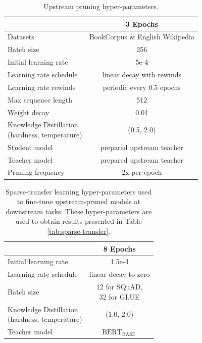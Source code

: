 \documentclass[11pt]{article}
\newcommand{\greyrule}{\arrayrulecolor{black!30}\midrule\arrayrulecolor{black}}
\newcommand{\bert}{$\textrm{BERT}_{\textrm{BASE}}\,$}
\begin{document}
\begin{table}
      \centering
         {\small 
            \begin{tabular}{l|c}
            \toprule
            & 3 Epochs \\
            \midrule
            Datasets & BookCorpus \& English Wikipedia \\
            \greyrule
            Batch size & 256 \\
            \greyrule
            Initial learning rate & 5e-4 \\
            Learning rate schedule & linear decay with rewinds \\
            Learning rate rewinds & periodic every 0.5 epochs \\
            \greyrule
            Max sequence length & 512 \\
            Weight decay & 0.01 \\
            \greyrule
            \makecell{Knowledge Distillation\\(hardness, temperature)} & (0.5, 2.0) \\
            \greyrule
            Student model & prepared upstream teacher \\
            Teacher model & prepared upstream teacher \\
            \greyrule
            Pruning frequency & 2x per epoch \\
            \bottomrule
            \end{tabular}
        }
            \caption{Upstream pruning hyper-parameters.}
            \label{tab:hyperparams-UpstreamPruning}
\end{table}

\begin{table}
      \centering
        {\small 
            \begin{tabular}{l|c}
            \toprule
            & 8 Epochs \\
            \midrule
            Initial learning rate & 1.5e-4 \\
            Learning rate schedule & linear decay to zero \\
            \greyrule
            Batch size & \makecell{12 for SQuAD,\\ 32 for GLUE} \\
            \greyrule
            \makecell{Knowledge Distillation\\(hardness, temperature)} & (1.0, 2.0) \\
            \greyrule
            Teacher model & \bert \\
            \bottomrule
            \end{tabular}
        }
        \caption{Sparse-transfer learning hyper-parameters used to fine-tune upstream-pruned models at downstream tasks. These hyper-parameters are used to obtain results presented in Table \ref{tab:sparse-transfer}.}
    \label{tab:hyperparams-transfer}
\end{table}
\end{document}
